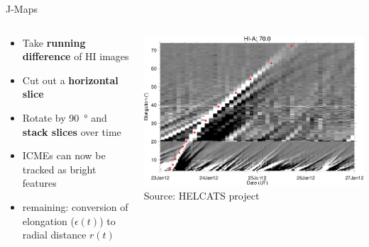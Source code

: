\documentclass[10pt,aspectratio=169,usenames,dvipsnames]{beamer}
\begin{document}
\begin{frame}{J-Maps}
    \begin{columns}
        \begin{column}{0.35\textwidth}
            \begin{itemize}
                \item Take \textbf{running difference} of HI images
                \item Cut out a \textbf{horizontal slice}
                \item Rotate by \SI{90}{\degree} and \textbf{stack slices} over time
                \item ICMEs can now be tracked as bright features
                \item remaining: conversion of elongation ($\epsilon(t)$) to radial distance $r(t)$
            \end{itemize}
        \end{column}
        \begin{column}{0.65\textwidth}
            \includegraphics[width=\textwidth]{images/HCME_A__20120123_01.png}
            \small Source: HELCATS project
        \end{column}
    \end{columns}
\end{frame}
\end{document}
